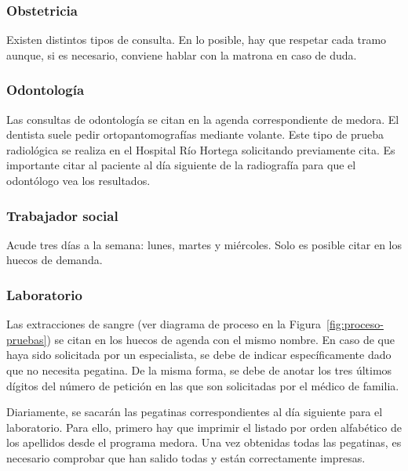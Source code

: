 \subsubsection{Obstetricia}

Existen distintos tipos de consulta. En lo posible, hay que respetar cada tramo aunque, si es necesario, conviene hablar con la \gls{matrona} en caso de duda.

\subsubsection{Odontología}

Las consultas de odontología se citan en la agenda correspondiente de \Gls{medora}.
El dentista suele pedir \gls{ortopantomografías} mediante \gls{volante}. Este tipo de prueba radiológica se realiza en el Hospital Río Hortega solicitando previamente cita.
Es importante citar al paciente al día siguiente de la radiografía para que el odontólogo vea los resultados.

\subsubsection{Trabajador social}

Acude tres días a la semana: lunes, martes y miércoles.
Solo es posible citar en los huecos de demanda.

\subsubsection{Laboratorio}

Las extracciones de sangre (ver diagrama de proceso en la Figura~\ref{fig:proceso-pruebas}) se citan en los huecos de agenda con el mismo nombre.
En caso de que haya sido solicitada por un especialista, se debe de indicar específicamente dado que no necesita pegatina.
De la misma forma, se debe de anotar los tres últimos dígitos del número de petición en las que son solicitadas por el médico de familia.


Diariamente, se sacarán las pegatinas correspondientes al día siguiente para el laboratorio.
Para ello, primero hay que imprimir el listado por orden alfabético de los apellidos desde el programa \Gls{medora}.
Una vez obtenidas todas las pegatinas, es necesario comprobar que han salido todas y están correctamente impresas.

